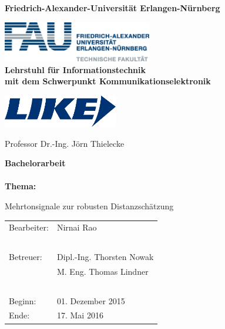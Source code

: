 \begin{titlepage}
\label{sec:Titel}

\setcounter{page}{0}

\begin{center}
\large\textbf{Friedrich-Alexander-Universität Erlangen-Nürnberg}
\end{center}
\vspace{0.2cm}
\centering
\includegraphics[width=6.5cm]{images/FAU_tech_logo}
\vspace{0.2cm}
~\\\large\textbf{Lehrstuhl für Informationstechnik\\mit dem Schwerpunkt Kommunikationselektronik} 
\vspace{0.2cm}
\begin{center}
\includegraphics[width=5cm]{images/logo_like}
\end{center}

\begin{center}
Professor Dr.-Ing. Jörn Thielecke	
\end{center}
\vspace{0.8cm}
\begin{center}
	\large\textbf{Bachelorarbeit}\\
	~\\
	\textbf{Thema:}\\
\end{center}
\begin{center}
Mehrtonsignale zur robusten Distanzschätzung
\end{center}
\vspace{1.5cm}
\begin{flushleft}

		\begin{tabular}{ll}
			Bearbeiter: 	& 	Nirnai Rao 							\\
			~\\
			Betreuer: 		& Dipl.-Ing. Thorsten Nowak\\
										& M. Eng. Thomas Lindner\\
     
			~\\
			Beginn: 		  & 	01. Dezember 2015 							\\
			Ende: 		          & 	17. Mai 2016 						\\
		\end{tabular}
		
\end{flushleft}

\end{titlepage}